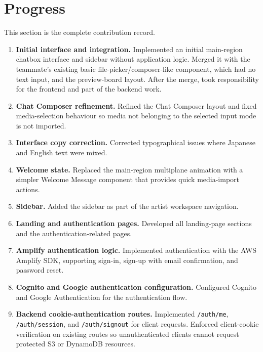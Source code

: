 \section{Progress}
This section is the complete contribution record.

\begin{enumerate}
  \item \textbf{Initial interface and integration.} Implemented an initial main-region chatbox interface and sidebar without application logic. Merged it with the teammate's existing basic file-picker/composer-like component, which had no text input, and the preview-board layout. After the merge, took responsibility for the frontend and part of the backend work.

  \item \textbf{Chat Composer refinement.} Refined the Chat Composer layout and fixed media-selection behaviour so media not belonging to the selected input mode is not imported.

  \item \textbf{Interface copy correction.} Corrected typographical issues where Japanese and English text were mixed.

  \item \textbf{Welcome state.} Replaced the main-region multiplane animation with a simpler Welcome Message component that provides quick media-import actions.

  \item \textbf{Sidebar.} Added the sidebar as part of the artist workspace navigation.

  \item \textbf{Landing and authentication pages.} Developed all landing-page sections and the authentication-related pages.

  \item \textbf{Amplify authentication logic.} Implemented authentication with the AWS Amplify SDK, supporting sign-in, sign-up with email confirmation, and password reset.

  \item \textbf{Cognito and Google authentication configuration.} Configured Cognito and Google Authentication for the authentication flow.

  \item \textbf{Backend cookie-authentication routes.} Implemented \texttt{/auth/me}, \texttt{/auth/session}, and \texttt{/auth/signout} for client requests. Enforced client-cookie verification on existing routes so unauthenticated clients cannot request protected S3 or DynamoDB resources.


\end{enumerate}
